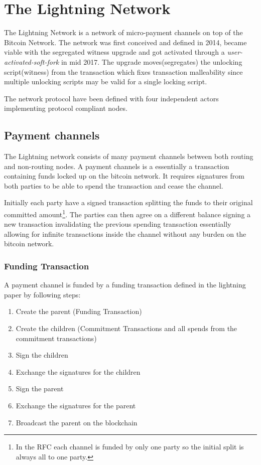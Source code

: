 \chapter{The Lightning Network}
\label{sec:lightning:network}

The Lightning Network is a network of micro-payment channels on top of the Bitcoin Network. The network was first conceived and defined in 2014\cite{poon:dryja:lightning:network}, became viable with the segregated witness upgrade\cite{bip:0141:segwit} and got activated through a \textit{user-activated-soft-fork} in mid 2017\cite{bip:uasf:segwit}. The upgrade moves(segregates) the unlocking script(witness) from the transaction which fixes transaction malleability since multiple unlocking scripts may be valid for a single locking script. 

The network protocol have been defined\cite{repository:lightning:rfc} with four independent actors implementing protocol compliant nodes\cite{repository:lnd}\cite{repository:eclair}\cite{repository:clightning}\cite{repository:lit}.

\section{Payment channels}

The Lightning network consists of many payment channels between both routing and non-routing nodes.
A payment channels is a essentially a transaction containing funds locked up on the bitcoin network. It requires signatures from both parties to be able to spend the transaction and cease the channel.

Initially each party have a signed transaction splitting the funds to their original committed amount\footnote{In the RFC each channel is funded by only one party so the initial split is always all to one party.}. The parties can then agree on a different balance signing a new transaction invalidating the previous spending transaction essentially allowing for infinite transactions inside the channel without any burden on the bitcoin network.

\subsection{Funding Transaction}

A payment channel is funded by a funding transaction defined in the lightning paper by following steps\cite{poon:dryja:lightning:network}:

\begin{enumerate}
	\item  Create the parent (Funding Transaction)
	\item  Create the children (Commitment Transactions and all spends from the commitment transactions)
	\item  Sign the children
	\item  Exchange the signatures for the children
	\item  Sign the parent
	\item  Exchange the signatures for the parent
	\item  Broadcast the parent on the blockchain
\end{enumerate}

